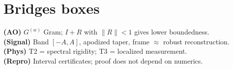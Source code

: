 \section{Bridges boxes}
\textbf{(AO)} $G^{(w)}$ Gram; $I+R$ with $\|R\|<1$ gives lower boundedness. \\
\textbf{(Signal)} Band $[-A,A]$, apodized taper, frame $\approx$ robust reconstruction. \\
\textbf{(Phys)} T2 = spectral rigidity; T3 = localized measurement. \\
\textbf{(Repro)} Interval certificates; proof does not depend on numerics.

